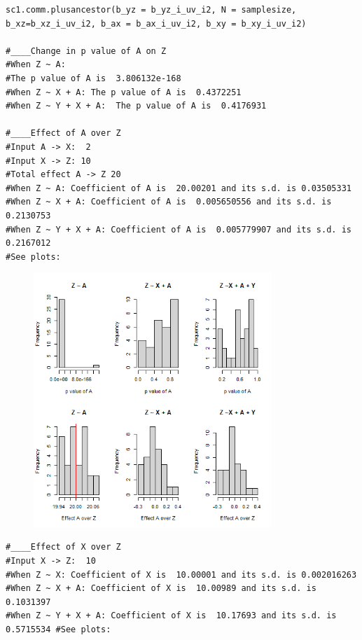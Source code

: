 \documentclass{article}
\begin{document}
\begin{lstlisting}
sc1.comm.plusancestor(b_yz = b_yz_i_uv_i2, N = samplesize, b_xz=b_xz_i_uv_i2, b_ax = b_ax_i_uv_i2, b_xy = b_xy_i_uv_i2)

#____Change in p value of A on Z
#When Z ~ A: 
#The p value of A is  3.806132e-168 
#When Z ~ X + A: The p value of A is  0.4372251 
#When Z ~ Y + X + A:  The p value of A is  0.4176931 

#____Effect of A over Z
#Input A -> X:  2 
#Input X -> Z: 10 
#Total effect A -> Z 20 
#When Z ~ A: Coefficient of A is  20.00201 and its s.d. is 0.03505331 
#When Z ~ X + A: Coefficient of A is  0.005650556 and its s.d. is 0.2130753 
#When Z ~ Y + X + A: Coefficient of A is  0.005779907 and its s.d. is 0.2167012 
#See plots:
\end{lstlisting}

\begin{figure}[h]
\includegraphics[width=9cm]{histA.sun.png}
\centering
\end{figure}

\begin{lstlisting}
#____Effect of X over Z
#Input X -> Z:  10 
#When Z ~ X: Coefficient of X is  10.00001 and its s.d. is 0.002016263 
#When Z ~ X + A: Coefficient of X is  10.00989 and its s.d. is 0.1031397 
#When Z ~ Y + X + A: Coefficient of X is  10.17693 and its s.d. is 0.5715534 #See plots:
\end{lstlisting}
\end{document}
